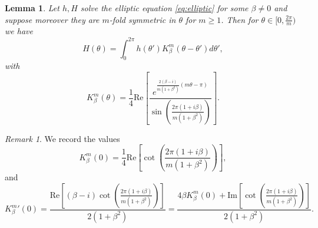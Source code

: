 \documentclass[10pt]{article}
\newtheorem{lemma}[theorem]{Lemma}
\theoremstyle{definition}
\theoremstyle{remark}
\newtheorem{remark}[theorem]{Remark}
\numberwithin{equation}{section}
\renewcommand{\Re}{\mathrm{Re}}
\renewcommand{\Im}{\mathrm{Im}}
\newcommand{\0}{\emptyset}
\newcommand{\bt}{\beta}
\newcommand{\tht}{\theta}
\begin{document}
	\begin{lemma}\label{lem:ker comp}
		Let $h, H$ solve the elliptic equation \eqref{eq:elliptic} for some $\bt\ne0$ and suppose moreover they are $m$-fold symmetric in $\theta$ for $m\geq 1$. Then for $\theta \in [0, \frac{2\pi}{m})$ we have
		\[
		H(\tht)=\int_{0}^{2\pi} h(\tht') K^m_{\beta}(\tht-\tht') d\tht',
		\]
		with 
  \[
 K^m_{\beta}(\theta)= \frac{1}{4}\Re \left[\frac{e^{\frac{2(\beta-i)}{m(1+\beta^2)}(m\theta-\pi)}}{\sin\left(\frac{2\pi(1+i\beta)}{m(1+\beta^2)}\right)}\right].
  \]
	\end{lemma}
	\begin{remark}\label{rem:derv ker 0}
We record the values
\[
K_\beta^m(0)=\frac{1}{4}\Re\left[\cot\left(\frac{2\pi(1+i\beta)}{m(1+\beta^2)}\right)\right],
\]
and
\[
{K_\beta^m} '(0)=\frac{\Re\left[(\beta-i)\cot\left(\frac{2\pi(1+i\beta)}{m(1+\beta^2)}\right)\right]}{2(1+\beta^2)}=\frac{4\beta K_\beta^m(0)+\Im\left[\cot\left(\frac{2\pi(1+i\beta)}{m(1+\beta^2)}\right)\right]}{2(1+\beta^2)}.
\]
	\end{remark}
\end{document}
